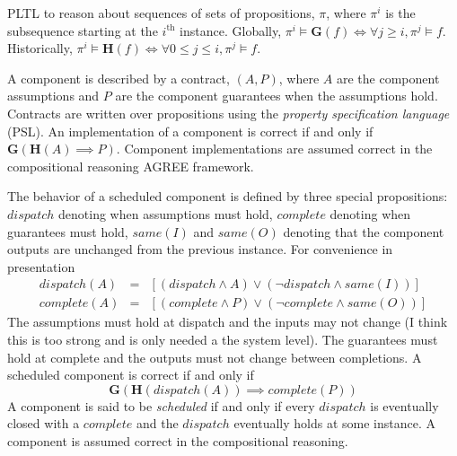 
\newcommand{\globally}{\ensuremath{\mathbf{G}}}
\newcommand{\historically}{\ensuremath{\mathbf{H}}}
\newcommand{\assumes}{\ensuremath{A}}
\newcommand{\guarantees}{\ensuremath{P}}
\newcommand{\dispatch}{\ensuremath{\mathit{dispatch}}}
\newcommand{\complete}{\ensuremath{\mathit{complete}}}
\newcommand{\same}[1]{\ensuremath{\mathit{same}(#1)}}
\newcommand{\inputs}{\ensuremath{I}}
\newcommand{\outputs}{\ensuremath{O}}
\newcommand{\system}{\ensuremath{S}}
\newcommand{\components}{\ensuremath{C}}
\newcommand{\schedule}{\ensuremath{\phi}}
\newcommand{\valid}{\ensuremath{\mathit{valid}}}

PLTL to reason about sequences of sets of propositions, $\pi$, where $\pi^i$ is the subsequence starting at the $i^\mathrm{th}$ instance.
Globally, $\pi^i \models \globally(f) \iff \forall j \ge i, \pi^j \models f$.
Historically, $\pi^i \models \historically(f) \iff \forall 0 \le j \le i, \pi^j \models f$.

A component is described by a contract, $(\assumes, \guarantees)$, where $\assumes$ are the component assumptions and $\guarantees$ are the component guarantees when the assumptions hold.
Contracts are written over propositions using the \emph{property specification language} (PSL).
An implementation of a component is correct if and only if $\globally(\historically(\assumes) \implies \guarantees)$.
Component implementations are assumed correct in the compositional reasoning AGREE framework.

The behavior of a scheduled component is defined by three special propositions: $\dispatch$ denoting when assumptions must hold, $\complete$ denoting when guarantees must hold, $\same{\inputs}$ and $\same{\outputs}$ denoting that the component outputs are unchanged from the previous instance. For convenience in presentation
\begin{eqnarray*}
  \dispatch(A) &=& \left[\left(\dispatch \wedge \assumes\right) \vee \left(\neg\dispatch \wedge \same{\inputs}\right)\right] \\
  \complete(A) &=& \left[\left(\complete \wedge \guarantees\right) \vee \left(\neg\complete \wedge \same{\outputs}\right)\right]
\end{eqnarray*}
The assumptions must hold at dispatch and the inputs may not change (I think this is too strong and is only needed a the system level). 
The guarantees must hold at complete and the outputs must not change between completions.
A scheduled component is correct if and only if
\[
  \globally\left(
    \historically\left(\dispatch(\assumes)\right) \implies \complete(\guarantees) \right)
\]
A component is said to be \emph{scheduled} if and only if every $\dispatch$ is eventually closed with a $\complete$ and the $\dispatch$ eventually holds at some instance.
A component is assumed correct in the compositional reasoning.


